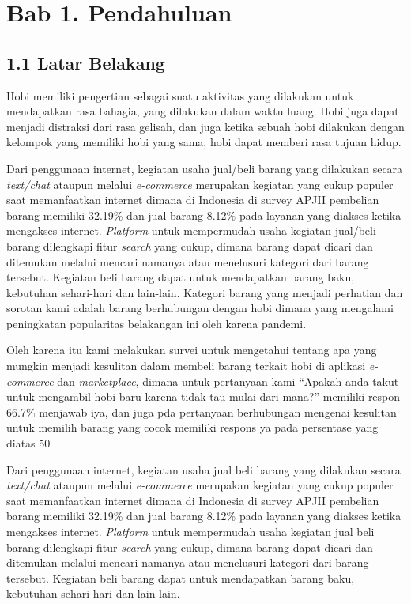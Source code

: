 \documentclass[a4paper]{article}
\begin{document}
\newpage
\section*{Bab 1. Pendahuluan}

\subsection*{1.1 Latar Belakang}

Hobi memiliki pengertian sebagai suatu aktivitas yang dilakukan untuk mendapatkan rasa bahagia, yang dilakukan dalam waktu luang. Hobi juga dapat menjadi distraksi dari rasa gelisah, dan juga ketika sebuah hobi dilakukan dengan kelompok yang memiliki hobi yang sama, hobi dapat memberi rasa tujuan hidup\autocite{zaidi2022passion}.


Dari penggunaan internet, kegiatan usaha jual/beli barang yang dilakukan secara \textit{text/chat} ataupun melalui \textit{e-commerce} merupakan kegiatan yang cukup populer saat memanfaatkan internet dimana di Indonesia di survey APJII pembelian barang memiliki 32.19\% dan jual barang 8.12\% pada layanan yang diakses ketika mengakses internet\autocite{indonesia2017infografis}. \textit{Platform} untuk mempermudah usaha kegiatan jual/beli barang dilengkapi fitur \textit{search} yang cukup, dimana barang dapat dicari dan ditemukan melalui mencari namanya atau menelusuri kategori dari barang tersebut. Kegiatan beli barang dapat untuk mendapatkan barang baku, kebutuhan sehari-hari dan lain-lain. Kategori barang yang menjadi perhatian dan sorotan kami adalah barang berhubungan dengan hobi dimana yang mengalami peningkatan popularitas belakangan ini oleh karena pandemi\autocite{langstedt2022loneliness}.


Oleh karena itu kami melakukan survei untuk mengetahui tentang apa yang mungkin menjadi kesulitan dalam membeli barang terkait hobi di aplikasi \textit{e-commerce} dan \textit{marketplace}, dimana untuk pertanyaan kami “Apakah anda takut untuk mengambil hobi baru karena tidak tau mulai dari mana?” memiliki respon 66.7\% menjawab iya, dan juga pda pertanyaan berhubungan mengenai kesulitan untuk memilih barang yang cocok memiliki respons ya pada persentase yang diatas 50%


Dari penggunaan internet, kegiatan usaha jual beli barang yang dilakukan secara \textit{text/chat} ataupun melalui \textit{e-commerce} merupakan kegiatan yang cukup populer saat memanfaatkan internet dimana di Indonesia di survey APJII pembelian barang memiliki 32.19\% dan jual barang 8.12\% pada layanan yang diakses ketika mengakses internet\autocite{indonesia2017infografis}. \textit{Platform} untuk mempermudah usaha kegiatan jual beli barang dilengkapi fitur \textit{search} yang cukup, dimana barang dapat dicari dan ditemukan melalui mencari namanya atau menelusuri kategori dari barang tersebut. Kegiatan beli barang dapat untuk mendapatkan barang baku, kebutuhan sehari-hari dan lain-lain.
\end{document}
